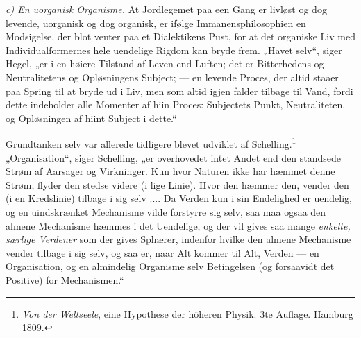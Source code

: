 \documentclass[12pt,a4paper]{book}
\newcommand{\runin}[1]{\emph{#1}\hspace{0.4em}}
\begin{document}
\runin{c) En uorganisk Organisme.} At Jordlegemet paa een Gang er livløst og
dog levende, uorganisk og dog organisk, er ifølge Immanensphilosophien en
Modsigelse, der blot venter paa et Dialektikens Pust, for at det organiske Liv
med Individualformernes hele uendelige Rigdom kan
bryde frem. „Havet selv“, siger Hegel, „er i en høiere Tilstand af Leven end
Luften; det er Bitterhedens og Neutralitetens og Opløsningens Subject; --- en
levende Proces, der altid staaer paa Spring til at bryde ud i Liv, men som
altid igjen falder tilbage til Vand, fordi dette indeholder alle Momenter af
hiin Proces: Subjectets Punkt, Neutraliteten, og Opløsningen af hiint Subject i
dette.“

Grundtanken selv var allerede tidligere blevet udviklet af
Schelling.\footnote{%
\emph{Von der Weltseele}, eine Hypothese der höheren Physik. 3te Auflage.
Hamburg 1809.}
„Organisation“, siger Schelling, „er overhovedet intet Andet end den standsede
Strøm af Aarsager og Virkninger. Kun hvor Naturen ikke har hæmmet denne Strøm,
flyder den stedse videre (i lige Linie). Hvor den hæmmer den, vender den (i en
Kredslinie) tilbage i sig selv .... Da Verden kun i sin Endelighed er uendelig,
og en uindskrænket Mechanisme vilde forstyrre sig selv, saa maa ogsaa den
almene Mechanisme hæmmes i det Uendelige, og der vil gives saa mange
\emph{enkelte, særlige Verdener} som der gives Sphærer, indenfor hvilke den
almene Mechanisme vender tilbage i sig selv, og saa er, naar Alt kommer til
Alt, Verden --- en Organisation, og en almindelig Organisme selv Betingelsen
(og forsaavidt det Positive) for Mechanismen.“
\end{document}
